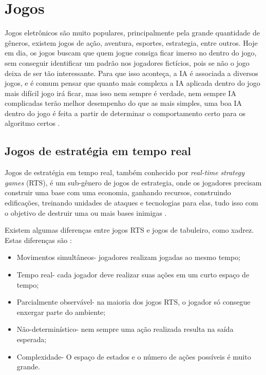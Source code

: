 \chapter{\label{chap:games}Jogos}
 
  Jogos eletrônicos são muito populares, principalmente pela grande quantidade de gêneros, existem jogos de ação, aventura, esportes, estrategia, entre outros. Hoje em dia, os jogos buscam que quem jogue consiga ficar imerso no dentro do jogo, sem conseguir identificar um padrão nos jogadores fictícios, pois se não o jogo deixa de ser tão interessante. Para que isso aconteça, a IA é associada a diversos jogos, e é comum pensar que quanto mais complexa a IA aplicada dentro do jogo mais difícil jogo irá ficar, mas isso nem sempre é verdade, nem sempre IA complicadas terão melhor desempenho do que as mais simples, uma boa IA dentro do jogo é feita a partir de determinar o comportamento certo para os algoritmo certos \cite{millington2009artificial}.
  
 \section{Jogos de estratégia em tempo real}
 
Jogos de estratégia em tempo real, também conhecido por \textit{real-time strategy games} (RTS), é um sub-gênero de jogos de estrategia, onde os jogadores precisam construir uma base com uma economia, ganhando recursos, construindo edificações, treinando unidades de ataques e tecnologias para elas, tudo isso com o objetivo de destruir uma ou mais bases inimigas \cite{ontanon2013survey, buro2012real}. 

Existem algumas diferenças entre jogos RTS e jogos de tabuleiro, como xadrez. Estas diferenças são \cite{ontanon2013survey}:

\begin{itemize}
	\item Movimentos simultâneos- jogadores realizam jogadas ao mesmo tempo;
	\item Tempo real- cada jogador deve realizar suas ações em um curto espaço de tempo;
	\item Parcialmente observável- na maioria dos jogos RTS, o jogador só consegue enxergar parte do ambiente;
	\item Não-determinístico- nem sempre uma ação realizada resulta  na saída esperada;
	\item Complexidade- O espaço de estados e o número de ações possíveis é muito grande.
\end{itemize} 


